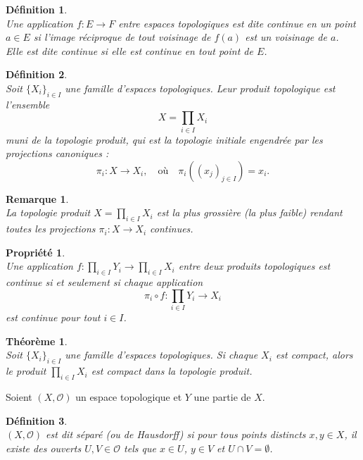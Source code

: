 \documentclass[a4paper, 14pt]{report}
\newtheorem{definition}{Définition}[section]
\newtheorem{remark}{Remarque}[section]
\newtheorem{propriety}{Propriété}[section]
\newtheorem{theorem}{Théorème}[section]
\begin{document}
\begin{onehalfspace}
{			
			\begin{definition} \cite{bourbaki2013general} \\
Une application \( f : E \to F \) entre espaces topologiques est dite continue en un point \( a \in E \) si l'image réciproque de tout voisinage de \( f(a) \) est un voisinage de \( a \).\\
				Elle est dite continue si elle est continue en tout point de \( E \).
			\end{definition}
			
			
			\begin{definition} \cite{bourbaki2013general}\\
Soit \(\{X_i\}_{i \in I}\) une famille d'espaces topologiques. Leur produit topologique est l'ensemble  
				\[
				X = \prod_{i \in I} X_i
				\]
muni de la topologie produit, qui est la topologie initiale engendrée par les projections canoniques :
				\[
				\pi_i : X \to X_i, \quad \text{où} \quad \pi_i((x_j)_{j \in I}) = x_i.
				\]
			\end{definition}
			
			\begin{remark} \cite{bourbaki2013general}\\
La topologie produit \(X = \prod_{i \in I} X_i \) est la plus grossière (la plus faible) rendant toutes les projections \(\pi_i : X \to X_i\) continues.
			\end{remark}
			
			\begin{propriety}  \cite{bourbaki2013general}\\
Une application \( f:  \prod_{i \in I} Y_i \to \prod_{i \in I} X_i \) entre deux produits topologiques est continue si et seulement si chaque application  
				\[
				\pi_i \circ f: \prod_{i \in I} Y_i \to X_i
				\]
				est continue pour tout \( i \in I \).
			\end{propriety}
			
			\begin{theorem}	\cite{bourbaki2013general}\\
Soit \( \{ X_i \}_{i \in I} \) une famille d'espaces topologiques. Si chaque \( X_i \) est compact, alors le produit \( \prod_{i \in I} X_i \) est compact dans la topologie produit.	
			\end{theorem}
			
Soient \( (X, \mathcal{O})\) un espace topologique et \( Y \) une partie de \( X \).
			
			\begin{definition}\cite{bourbaki2013general}\\
\( (X, \mathcal{O}) \) est dit séparé (ou de Hausdorff) si pour tous points distincts \( x, y \in X \), il existe des ouverts \( U, V \in \mathcal{O} \) tels que \( x \in U \), \( y \in V \) et \( U \cap V = \emptyset \).
			\end{definition}
			
}
\end{onehalfspace}
\end{document}
